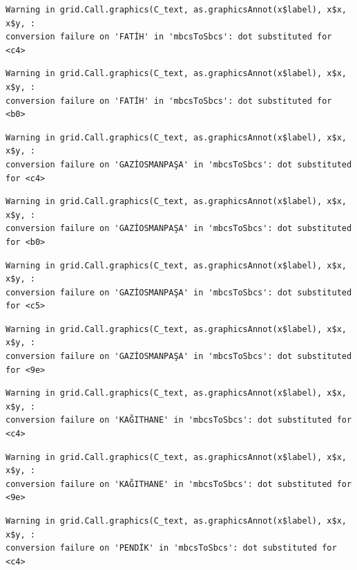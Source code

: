 \documentclass[
  11pt,
  a4paper,
  DIV=11,
  numbers=noendperiod]{scrartcl}
\begin{document}
\begin{verbatim}
Warning in grid.Call.graphics(C_text, as.graphicsAnnot(x$label), x$x, x$y, :
conversion failure on 'FATİH' in 'mbcsToSbcs': dot substituted for <c4>
\end{verbatim}

\begin{verbatim}
Warning in grid.Call.graphics(C_text, as.graphicsAnnot(x$label), x$x, x$y, :
conversion failure on 'FATİH' in 'mbcsToSbcs': dot substituted for <b0>
\end{verbatim}

\begin{verbatim}
Warning in grid.Call.graphics(C_text, as.graphicsAnnot(x$label), x$x, x$y, :
conversion failure on 'GAZİOSMANPAŞA' in 'mbcsToSbcs': dot substituted for <c4>
\end{verbatim}

\begin{verbatim}
Warning in grid.Call.graphics(C_text, as.graphicsAnnot(x$label), x$x, x$y, :
conversion failure on 'GAZİOSMANPAŞA' in 'mbcsToSbcs': dot substituted for <b0>
\end{verbatim}

\begin{verbatim}
Warning in grid.Call.graphics(C_text, as.graphicsAnnot(x$label), x$x, x$y, :
conversion failure on 'GAZİOSMANPAŞA' in 'mbcsToSbcs': dot substituted for <c5>
\end{verbatim}

\begin{verbatim}
Warning in grid.Call.graphics(C_text, as.graphicsAnnot(x$label), x$x, x$y, :
conversion failure on 'GAZİOSMANPAŞA' in 'mbcsToSbcs': dot substituted for <9e>
\end{verbatim}

\begin{verbatim}
Warning in grid.Call.graphics(C_text, as.graphicsAnnot(x$label), x$x, x$y, :
conversion failure on 'KAĞITHANE' in 'mbcsToSbcs': dot substituted for <c4>
\end{verbatim}

\begin{verbatim}
Warning in grid.Call.graphics(C_text, as.graphicsAnnot(x$label), x$x, x$y, :
conversion failure on 'KAĞITHANE' in 'mbcsToSbcs': dot substituted for <9e>
\end{verbatim}

\begin{verbatim}
Warning in grid.Call.graphics(C_text, as.graphicsAnnot(x$label), x$x, x$y, :
conversion failure on 'PENDİK' in 'mbcsToSbcs': dot substituted for <c4>
\end{verbatim}
\end{document}
